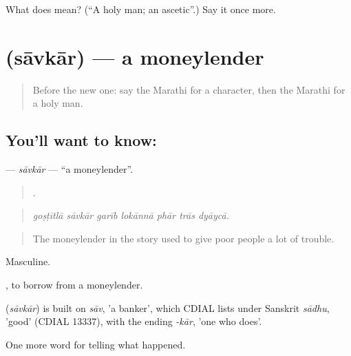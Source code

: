 \begin{tcolorbox}[breakable,colback=teal!4,colframe=teal!35!black,title={Before you move on}]
What does  mean? (\textquotedblleft{}A holy man; an ascetic\textquotedblright{}.) Say it once more.
\end{tcolorbox}
\section[\texorpdfstring{\mr{सावकार} (sāvkār)}{सावकार (sāvkār)}]{ (sāvkār) — a moneylender}

\label{lesson:MR-C339-savkar}



\begin{quote}
Before the new one: say the Marathi for a character, then the Marathi for a holy man.
\end{quote}

\subsection*{You'll want to know: }
\textbf{} — \emph{sāvkār} — \textquotedblleft{}a moneylender\textquotedblright{}.

\begin{quote}
      .
\end{quote}

\begin{quote}
\emph{goṣṭītlā sāvkār garīb lokānnā phār trās dyāycā.}
\end{quote}

\begin{quote}
The moneylender in the story used to give poor people a lot of trouble.
\end{quote}

Masculine.

  , to borrow from a moneylender.

\begin{cousinweb}
\textbf{} (\emph{sāvkār}) is built on \emph{sāv}, 'a banker', which CDIAL lists under Sanskrit \emph{sādhu}, 'good' (CDIAL 13337), with the ending \emph{-kār}, 'one who does'.
\end{cousinweb}

\begin{grammarlens}[title={What you've built}]
One more word for telling what happened.
\end{grammarlens}


